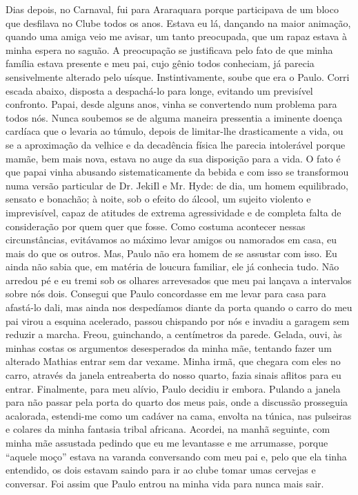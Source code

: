 Dias depois, no Carnaval, fui para Araraquara porque participava de um bloco que desfilava no Clube todos os anos.
Estava eu lá, dançando na maior animação, quando uma amiga veio me avisar, um tanto preocupada, que um rapaz estava à minha espera no saguão.
A preocupação se justificava pelo fato de que minha família estava presente e meu pai, cujo gênio todos conheciam, já parecia sensivelmente alterado pelo uísque.
 Instintivamente, soube que era o Paulo.
Corri escada abaixo, disposta a despachá-lo para longe, evitando um previsível confronto.
Papai, desde alguns anos, vinha se convertendo num problema para todos nós.
Nunca soubemos se de alguma maneira pressentia a iminente doença cardíaca que o levaria ao túmulo, depois de limitar-lhe drasticamente a vida, ou se a aproximação da velhice e da decadência física lhe parecia intolerável porque mamãe, bem mais nova, estava no auge da sua disposição para a vida.
O fato é que papai vinha abusando sistematicamente da bebida e com isso se transformou numa versão particular de Dr.
JekiIl e Mr. Hyde: de dia, um homem equilibrado, sensato e bonachão; à noite, sob o efeito do álcool, um sujeito violento e imprevisível, capaz de atitudes de extrema agressividade e de completa falta de consideração por quem quer que fosse.
Como costuma acontecer nessas circunstâncias, evitávamos ao máximo levar amigos ou namorados em casa, eu mais do que os outros.
Mas, Paulo não era homem de se assustar com isso.
Eu ainda não sabia que, em matéria de loucura familiar, ele já conhecia tudo.
Não arredou pé e eu tremi sob os olhares arrevesados que meu pai lançava a intervalos sobre nós dois.
Consegui que Paulo concordasse em me levar para casa para afastá-lo dali, mas ainda nos despedíamos diante da porta quando o carro do meu pai virou a esquina acelerado, passou chispando por nós e invadiu a garagem sem reduzir a marcha.
Freou, guinchando, a centímetros da parede.
Gelada, ouvi, às minhas costas os argumentos desesperados da minha mãe, tentando fazer um alterado Mathias entrar sem dar vexame.
 Minha irmã, que chegara com eles no carro, através da janela entreaberta do nosso quarto, fazia sinais aflitos para eu entrar.
Finalmente, para meu alívio, Paulo decidiu ir embora.
Pulando a janela para não passar pela porta do quarto dos meus pais, onde a discussão prosseguia acalorada, estendi-me como um cadáver na cama, envolta na túnica, nas pulseiras e colares da minha fantasia tribal africana.
Acordei, na manhã seguinte, com minha mãe assustada pedindo que eu me levantasse e me arrumasse, porque ``aquele moço'' estava na varanda conversando com meu pai e, pelo que ela tinha entendido, os dois estavam saindo para ir ao clube tomar umas cervejas e conversar.
 Foi assim que Paulo entrou na minha vida para nunca mais sair.

